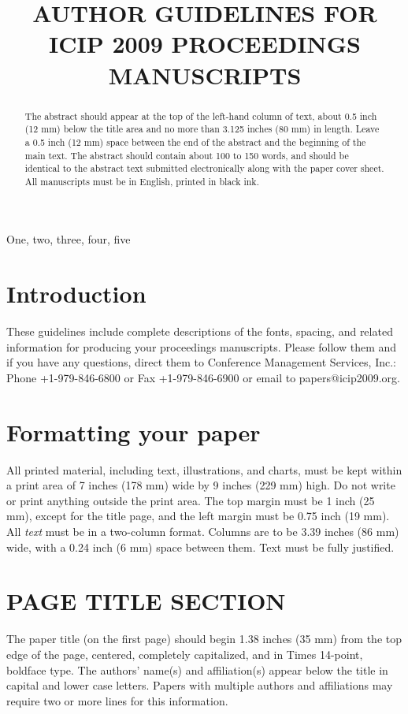 \documentclass{article}
\title{AUTHOR GUIDELINES FOR ICIP 2009 PROCEEDINGS MANUSCRIPTS}
\begin{document}
%
\maketitle
%
\begin{abstract}
The abstract should appear at the top of the left-hand column of text, about
0.5 inch (12 mm) below the title area and no more than 3.125 inches (80 mm) in
length.  Leave a 0.5 inch (12 mm) space between the end of the abstract and the
beginning of the main text.  The abstract should contain about 100 to 150
words, and should be identical to the abstract text submitted electronically
along with the paper cover sheet.  All manuscripts must be in English, printed
in black ink.
\end{abstract}
%
\begin{keywords}
One, two, three, four, five
\end{keywords}
%
\section{Introduction}
\label{sec:intro}

These guidelines include complete descriptions of the fonts, spacing, and
related information for producing your proceedings manuscripts. Please follow
them and if you have any questions, direct them to Conference Management
Services, Inc.: Phone +1-979-846-6800 or Fax +1-979-846-6900 or email
to papers@icip2009.org.

\section{Formatting your paper}
\label{sec:format}

All printed material, including text, illustrations, and charts, must be kept
within a print area of 7 inches (178 mm) wide by 9 inches (229 mm) high. Do
not write or print anything outside the print area. The top margin must be 1
inch (25 mm), except for the title page, and the left margin must be 0.75 inch
(19 mm).  All {\it text} must be in a two-column format. Columns are to be 3.39
inches (86 mm) wide, with a 0.24 inch (6 mm) space between them. Text must be
fully justified.

\section{PAGE TITLE SECTION}
\label{sec:pagestyle}

The paper title (on the first page) should begin 1.38 inches (35 mm) from the
top edge of the page, centered, completely capitalized, and in Times 14-point,
boldface type.  The authors' name(s) and affiliation(s) appear below the title
in capital and lower case letters.  Papers with multiple authors and
affiliations may require two or more lines for this information.
\end{document}
